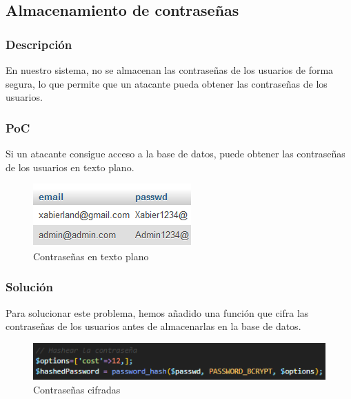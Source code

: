 \documentclass{report}
\begin{document}
            \subsection{Almacenamiento de contraseñas}
                \subsubsection{Descripción}
                    En nuestro sistema, no se almacenan las contraseñas de los usuarios de forma segura, lo que permite que un atacante pueda obtener las contraseñas de los usuarios.
                \subsubsection{PoC}
                    Si un atacante consigue acceso a la base de datos, puede obtener las contraseñas de los usuarios en texto plano.
                    \begin{figure}[H]
                        \centering
                        \includegraphics[width=\textwidth]{./img/vulnerabilidades/3.2.3.1.png}
                        \caption{Contraseñas en texto plano}
                    \end{figure}
                \subsubsection{Solución}
                    Para solucionar este problema, hemos añadido una función que cifra las contraseñas de los usuarios antes de almacenarlas en la base de datos.
                    \begin{figure}[H]
                        \centering
                        \includegraphics[width=\textwidth]{./img/vulnerabilidades/3.2.3.2.png}
                        \caption{Contraseñas cifradas}
                    \end{figure}
        \clearpage
\end{document}
